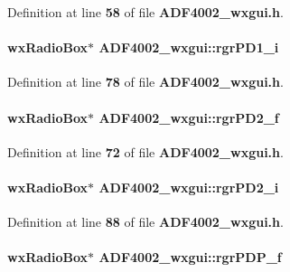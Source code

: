 Definition at line {\bf 58} of file {\bf A\+D\+F4002\+\_\+wxgui.\+h}.

\paragraph[{rgr\+P\+D1\+\_\+i}]{\setlength{\rightskip}{0pt plus 5cm}wx\+Radio\+Box$\ast$ A\+D\+F4002\+\_\+wxgui\+::rgr\+P\+D1\+\_\+i}\label{classADF4002__wxgui_ab799e03ea0325a9e5aeffb9c7ee4c951}


Definition at line {\bf 78} of file {\bf A\+D\+F4002\+\_\+wxgui.\+h}.

\paragraph[{rgr\+P\+D2\+\_\+f}]{\setlength{\rightskip}{0pt plus 5cm}wx\+Radio\+Box$\ast$ A\+D\+F4002\+\_\+wxgui\+::rgr\+P\+D2\+\_\+f}\label{classADF4002__wxgui_a233350446dd07099744b86dbf56333c1}


Definition at line {\bf 72} of file {\bf A\+D\+F4002\+\_\+wxgui.\+h}.

\paragraph[{rgr\+P\+D2\+\_\+i}]{\setlength{\rightskip}{0pt plus 5cm}wx\+Radio\+Box$\ast$ A\+D\+F4002\+\_\+wxgui\+::rgr\+P\+D2\+\_\+i}\label{classADF4002__wxgui_a6f37b9ac7b41a287c556053e0095eedc}


Definition at line {\bf 88} of file {\bf A\+D\+F4002\+\_\+wxgui.\+h}.

\paragraph[{rgr\+P\+D\+P\+\_\+f}]{\setlength{\rightskip}{0pt plus 5cm}wx\+Radio\+Box$\ast$ A\+D\+F4002\+\_\+wxgui\+::rgr\+P\+D\+P\+\_\+f}\label{classADF4002__wxgui_afcba5ebc073550e286370fd3dfb0805d}



